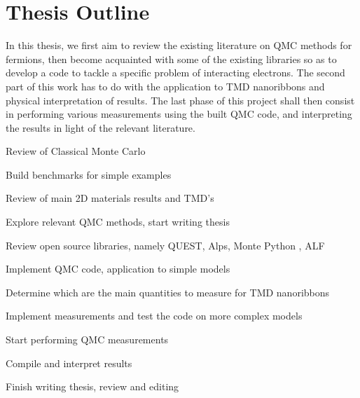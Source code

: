 \section{Thesis Outline}
\label{sec:int_outline}

In this thesis, we first aim to review the existing literature on QMC methods for fermions, then become acquainted with some of the existing libraries so as to develop a code to tackle a specific problem of interacting electrons. The second part of this work has to do with the application to TMD nanoribbons and physical interpretation of results. The last phase of this project shall then consist in performing various measurements using the built QMC code, and interpreting the results in light of the relevant literature.

Review of Classical Monte Carlo

Build benchmarks for simple examples

Review of main 2D materials results and TMD's

Explore relevant QMC methods, start writing thesis

Review open source libraries, namely QUEST, Alps, Monte Python , ALF 

Implement QMC code, application to simple models

Determine which are the main quantities to measure for TMD nanoribbons

Implement measurements and test the code on more complex models

Start performing QMC measurements

Compile and interpret results

Finish writing thesis, review and editing